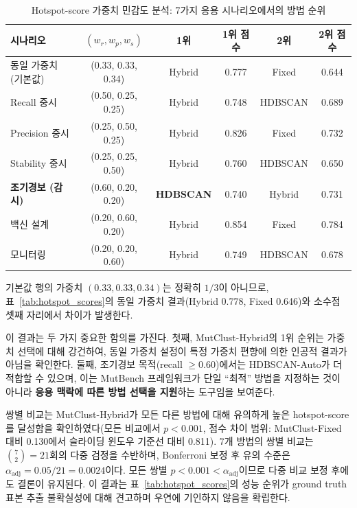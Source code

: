 \begin{table}[htbp]
\centering
\caption{Hotspot-score 가중치 민감도 분석: 7가지 응용 시나리오에서의 방법 순위}
\label{tab:weight_sensitivity}
\begin{tabular}{lccccc}
\toprule
\textbf{시나리오} & \textbf{$(w_r, w_p, w_s)$} & \textbf{1위} & \textbf{1위 점수} & \textbf{2위} & \textbf{2위 점수} \\
\midrule
동일 가중치 (기본값) & (0.33, 0.33, 0.34) & Hybrid & 0.777 & Fixed & 0.644 \\
Recall 중시 & (0.50, 0.25, 0.25) & Hybrid & 0.748 & HDBSCAN & 0.689 \\
Precision 중시 & (0.25, 0.50, 0.25) & Hybrid & 0.826 & Fixed & 0.732 \\
Stability 중시 & (0.25, 0.25, 0.50) & Hybrid & 0.760 & HDBSCAN & 0.650 \\
\midrule
\textbf{조기경보 (감시)} & (0.60, 0.20, 0.20) & \textbf{HDBSCAN} & 0.740 & Hybrid & 0.731 \\
백신 설계 & (0.20, 0.60, 0.20) & Hybrid & 0.854 & Fixed & 0.784 \\
모니터링 & (0.20, 0.20, 0.60) & Hybrid & 0.749 & HDBSCAN & 0.678 \\
\bottomrule
\end{tabular}
\begin{minipage}{\textwidth}
\smallskip
\footnotesize 기본값 행의 가중치 $(0.33, 0.33, 0.34)$는 정확히 $1/3$이 아니므로, 표~\ref{tab:hotspot_scores}의 동일 가중치 결과(Hybrid 0.778, Fixed 0.646)와 소수점 셋째 자리에서 차이가 발생한다.
\end{minipage}
\end{table}

이 결과는 두 가지 중요한 함의를 가진다.
첫째, MutClust-Hybrid의 1위 순위는 가중치 선택에 대해 강건하여, 동일 가중치 설정이 특정 가중치 편향에 의한 인공적 결과가 아님을 확인한다.
둘째, 조기경보 목적(recall $\geq 0.60$)에서는 HDBSCAN-Auto가 더 적합할 수 있으며, 이는 MutBench 프레임워크가 단일 ``최적'' 방법을 지정하는 것이 아니라 \textbf{응용 맥락에 따른 방법 선택을 지원}하는 도구임을 보여준다.

쌍별 비교는 MutClust-Hybrid가 모든 다른 방법에 대해 유의하게 높은 hotspot-score를 달성함을 확인하였다(모든 비교에서 $p < 0.001$, 점수 차이 범위: MutClust-Fixed 대비 0.130에서 슬라이딩 윈도우 기준선 대비 0.811). 7개 방법의 쌍별 비교는 $\binom{7}{2} = 21$회의 다중 검정을 수반하며, Bonferroni 보정 후 유의 수준은 $\alpha_{\text{adj}} = 0.05 / 21 = 0.0024$이다. 모든 쌍별 $p < 0.001 < \alpha_{\text{adj}}$이므로 다중 비교 보정 후에도 결론이 유지된다.
이 결과는 표~\ref{tab:hotspot_scores}의 성능 순위가 ground truth 표본 추출 불확실성에 대해 견고하며 우연에 기인하지 않음을 확립한다.

